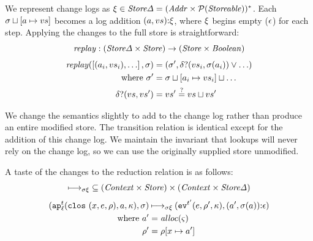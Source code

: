 \documentclass[9pt]{sigplanconf} %
\begin{document}
We represent change logs as $\msdiff \in \StoreDelta = (\Addr \times
  \Set(\Storeable))^*$. Each $\msto\sqcup[\maddr \mapsto \mval{s}]$
 becomes a log addition
$\cons{\ttuple{\maddr}{\mval{s}}}{\msdiff}$, where $\msdiff$ begins
empty ($\mtlst$) for each step. Applying the changes to the full store
is straightforward:
\begin{equation*}
\replay : (\StoreDelta \times \Store) \to (\Store \times \Boolean)
\end{equation*}
\begin{align*}
\replay(\left[ \ttuple{\maddr_i}{\mval{s_i}}, \ldots\right], \msto) &=
\ttuple{\msto'}
       {\diffp(\mval{s_i}, \msto(\maddr_i)) \vee \ldots} \\
\text{ where } \msto' &= {\msto \sqcup [\maddr_i \mapsto \mval{s_i}] \sqcup \ldots} \\
\diffp(\mval{s}, \mval{s'}) &= \mval{s'} \overset{?}{=} \mval{s} \sqcup \mval{s'}
\end{align*}

We change the semantics slightly to add to the change log rather than
produce an entire modified store.  The transition relation is
identical except for the addition of this change log.  We maintain the
invariant that lookups will never rely on the change log, so we can
use the originally supplied store unmodified.

A taste of the changes to the reduction relation is as follows:
\begin{equation*}
\dmachstep \subseteq (\Context\times\Store) \times (\Context\times\StoreDelta) 
\end{equation*}
\begin{align*}
\ttuple{\ap[^\mcntr_\mlab]{\clos{\mvar,\mexp,\menv},\maddr,\mkont}}{\msto} & \dmachstep
\ttuple{\ev[^{\mcntr'}]{\mexp,\menv',\mkont}}{\cons{\ttuple{\maddr'}{\msto(\maddr)}}{\epsilon}} \\
\text{ where }\maddr' &= \alloc(\mstate) \\
              \menv' &= \menv[\mvar\mapsto\maddr']
\end{align*}

\end{document}
